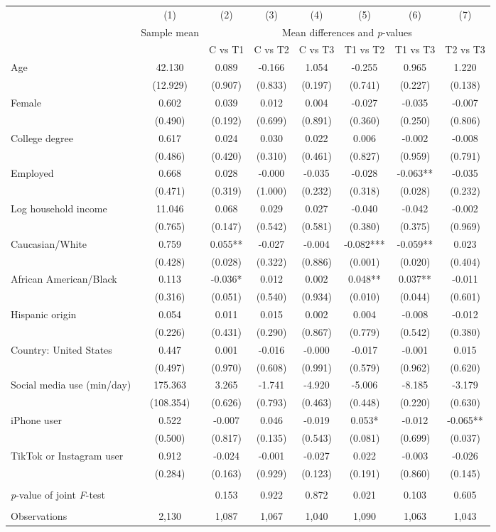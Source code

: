 \begin{tabular}{l*{7}c}
\toprule
 & (1) & (2) & (3) & (4) & (5) & (6) & (7) \\
 & \multicolumn{1}{c}{Sample mean} & \multicolumn{6}{c}{Mean differences and \textit{p}-values}\\ \cmidrule(lr){2-2} \cmidrule(lr){3-8}
  &  & C vs T1 & C vs T2 & C vs T3 & T1 vs T2 & T1 vs T3 & T2 vs T3 \\
\midrule
Age&42.130&0.089&-0.166&1.054&-0.255&0.965&1.220\\
&(12.929)&(0.907)&(0.833)&(0.197)&(0.741)&(0.227)&(0.138)\\
Female&0.602&0.039&0.012&0.004&-0.027&-0.035&-0.007\\
&(0.490)&(0.192)&(0.699)&(0.891)&(0.360)&(0.250)&(0.806)\\
College degree&0.617&0.024&0.030&0.022&0.006&-0.002&-0.008\\
&(0.486)&(0.420)&(0.310)&(0.461)&(0.827)&(0.959)&(0.791)\\
Employed&0.668&0.028&-0.000&-0.035&-0.028&-0.063**&-0.035\\
&(0.471)&(0.319)&(1.000)&(0.232)&(0.318)&(0.028)&(0.232)\\
Log household income&11.046&0.068&0.029&0.027&-0.040&-0.042&-0.002\\
&(0.765)&(0.147)&(0.542)&(0.581)&(0.380)&(0.375)&(0.969)\\
Caucasian/White&0.759&0.055**&-0.027&-0.004&-0.082***&-0.059**&0.023\\
&(0.428)&(0.028)&(0.322)&(0.886)&(0.001)&(0.020)&(0.404)\\
African American/Black&0.113&-0.036*&0.012&0.002&0.048**&0.037**&-0.011\\
&(0.316)&(0.051)&(0.540)&(0.934)&(0.010)&(0.044)&(0.601)\\
Hispanic origin&0.054&0.011&0.015&0.002&0.004&-0.008&-0.012\\
&(0.226)&(0.431)&(0.290)&(0.867)&(0.779)&(0.542)&(0.380)\\
Country: United States&0.447&0.001&-0.016&-0.000&-0.017&-0.001&0.015\\
&(0.497)&(0.970)&(0.608)&(0.991)&(0.579)&(0.962)&(0.620)\\
Social media use (min/day)&175.363&3.265&-1.741&-4.920&-5.006&-8.185&-3.179\\
&(108.354)&(0.626)&(0.793)&(0.463)&(0.448)&(0.220)&(0.630)\\
iPhone user&0.522&-0.007&0.046&-0.019&0.053*&-0.012&-0.065**\\
&(0.500)&(0.817)&(0.135)&(0.543)&(0.081)&(0.699)&(0.037)\\
TikTok or Instagram user&0.912&-0.024&-0.001&-0.027&0.022&-0.003&-0.026\\
&(0.284)&(0.163)&(0.929)&(0.123)&(0.191)&(0.860)&(0.145)\\
& & & & & & & \\ \textit{p}-value of joint \textit{F}-test & & 0.153 & 0.922 & 0.872 & 0.021 & 0.103 & 0.605 \\ & & & & & & & \\ \midrule
Observations & 2,130 & 1,087 & 1,067 & 1,040 & 1,090 & 1,063 & 1,043 \\
\bottomrule
\end{tabular}
